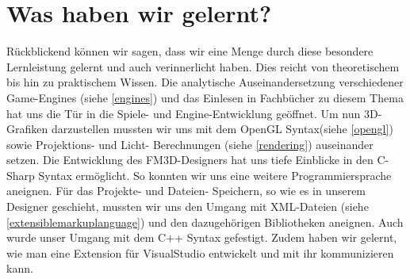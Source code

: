 \section{Was haben wir gelernt?}
Rückblickend können wir sagen, dass wir eine Menge durch diese besondere Lernleistung gelernt und auch verinnerlicht haben. Dies reicht von theoretischem bis hin zu praktischem Wissen. 
Die analytische Auseinandersetzung verschiedener Game-Engines (siehe \cref{engines}) und das Einlesen in Fachbücher zu diesem Thema hat uns die Tür in die Spiele- und Engine-Entwicklung geöffnet. Um nun 3D-Grafiken darzustellen mussten wir uns mit dem OpenGL Syntax(siehe \cref{opengl}) sowie Projektions- und Licht- Berechnungen (siehe \cref{rendering}) auseinander setzen.
Die Entwicklung des FM3D-Designers hat uns tiefe Einblicke in den C-Sharp Syntax ermöglicht. So konnten wir uns eine weitere Programmiersprache aneignen. Für das Projekte- und Dateien- Speichern, so wie es in unserem Designer geschieht, mussten wir uns den Umgang mit XML-Dateien (siehe \cref{extensiblemarkuplanguage}) und den dazugehörigen Bibliotheken aneignen.  Auch wurde unser Umgang mit dem C++ Syntax gefestigt. Zudem haben wir gelernt, wie man eine Extension für VisualStudio entwickelt und mit ihr kommunizieren kann.
